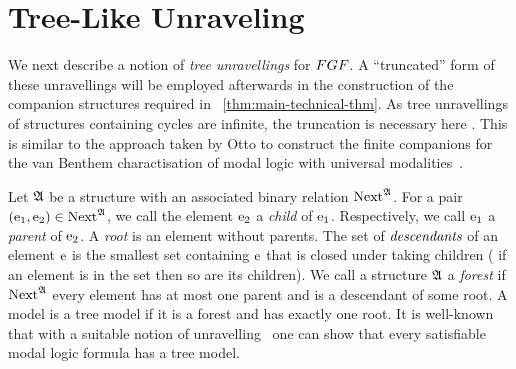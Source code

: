 
\section{Tree-Like Unraveling}\label{sec:unraveling}
We next describe a notion of \emph{tree unravellings} for $\FGF$.
A ``truncated'' form of these unravellings will be employed afterwards in the construction of the companion structures required in ~\cref{thm:main-technical-thm}.
As tree unravellings of structures containing cycles are infinite, the truncation is necessary here .
This is similar to the approach taken by Otto to construct the finite companions for the van Benthem charactisation of modal logic with universal modalities~\cite[Proof of Lemma 38]{Otto04}.

Let ${\mathfrak{A}}$ be a structure with an associated binary relation $\mathrm{Next}^{{\mathfrak{A}}}$.
For a pair $(\mathrm{e}_1, \mathrm{e}_2) \in \mathrm{Next}^{{\mathfrak{A}}}$, we call the element $\mathrm{e}_2$ a \emph{child} of $\mathrm{e}_1$. Respectively, we call $\mathrm{e}_1$ a \emph{parent} of $\mathrm{e}_2$.
A \emph{root} is an element without parents.
The set of $\emph{descendants}$ of an element $\mathrm{e}$ is the smallest set containing $\mathrm{e}$ that is closed under taking children (\ie{} if an element is in the set then so are its children).
We call a structure ${\mathfrak{A}}$ a \emph{forest} if $\mathrm{Next}^{{\mathfrak{A}}}$ every element has at most one parent and is a descendant of some root.
A model is a tree model if it is a forest and has exactly one root.
It is well-known that with a suitable notion of unravelling~\cite[Prop. 3]{Rosen97} one can show that every satisfiable modal logic formula has a tree model.

